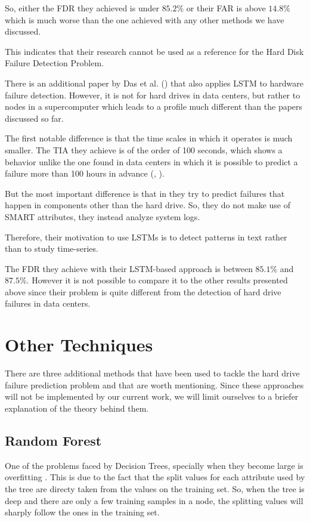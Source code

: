 So, either the FDR they achieved is under $85.2\%$ or their FAR is above $14.8\%$ which is much worse than the one achieved with any other methods we have discussed.

This indicates that their research cannot be used as a reference for the Hard Disk Failure Detection Problem.

There is an additional paper by Das et al. (\cite{das2018desh}) that also applies LSTM to hardware failure detection.
However, it is not for hard drives in data centers, but rather to nodes in a supercomputer which leads to a profile much different than the papers discussed so far.

The first notable difference is that the time scales in which it operates is much smaller.
The TIA they achieve is of the order of 100 seconds, which shows a behavior unlike the one found in data centers in which it is possible to predict a failure more than 100 hours in advance (\cite{Li14}, \cite{Zhu13}).

But the most important difference is that in \cite{das2018desh} they try to predict failures that happen in components other than the hard drive.
So, they do not make use of SMART attributes, they instead analyze system logs.

Therefore, their motivation to use LSTMs is to detect patterns in text rather than to study time-series.

The FDR they achieve with their LSTM-based approach is between $85.1\%$ and $87.5\%$.
However it is not possible to compare it to the other results presented above since their problem is quite different from the detection of hard drive failures in data centers.

\section{Other Techniques}

There are three additional methods that have been used to tackle the hard drive failure prediction problem and that are worth mentioning.
Since these approaches will not be implemented by our current work, we will limit ourselves to a briefer explanation of the theory behind them.

\subsection{Random Forest}\label{subsec:randomforest}

One of the problems faced by Decision Trees, specially when they become large is overfitting \cite{ying2019overview}.
This is due to the fact that the split values for each attribute used by the tree are directy taken from the values on the training set.
So, when the tree is deep and there are only a few training samples in a node, the splitting values will sharply follow the ones in the training set.

